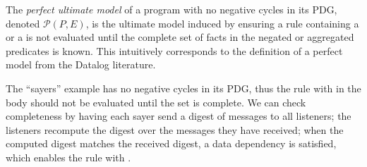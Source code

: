 \begin{definition}
The {\em perfect ultimate model} of a \lang program with no negative cycles in its PDG, denoted $\mathcal{P}(P, E)$, is the ultimate model induced by ensuring a rule containing a \dedalus{!} or a  is not evaluated until the complete set of facts in the negated or aggregated predicates is known.
This intuitively corresponds to the definition of a perfect model from the Datalog literature.
\end{definition}


The ``sayers'' example has no negative cycles in its PDG, thus the rule with  in the body should not be evaluated until the  set is complete.  We can check completeness by having each sayer send a digest of  messages to all listeners; the listeners recompute the digest over the  messages they have received; when the computed digest matches the received digest, a data dependency is satisfied, which enables the rule with .


